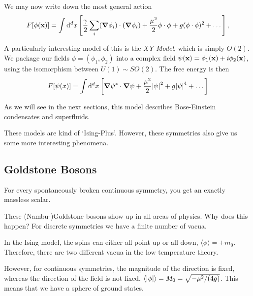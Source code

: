 We may now write down the most general action
\begin{equation}
  F[\phi(\vb{x})] = \int \dd[d]{x} \left[ \frac{\gamma}{2} \sum_i (\grad \phi_i) \cdot (\grad \phi_i) + \frac{\mu^2}{2} \phi \cdot \phi + g (\phi \cdot \phi)^2 + \dots \right],
\end{equation}

\begin{example}[O(2): XY-Model]
  A particularly interesting model of this is the \emph{XY-Model}, which is simply $O(2)$.
  We package our fields $\phi = (\phi_1, \phi_2)$ into a complex field $\psi(\vb{x}) = \phi_1 (\vb{x}) + i \phi_2 (\vb{x})$, using the isomorphism between $U(1) \sim SO(2)$.
  The free energy is then
  \begin{equation}
    F[\psi(x)] = \int \dd[d]{x} \left[ \grad \psi^* \cdot \grad \psi + \frac{\mu^2}{2} \abs{\psi}^2 + g \abs{ \psi}^4 + \dots \right]
  \end{equation}

  As we will see in the next sections, this model describes Bose-Einstein condensates and superfluids.
\end{example}

\begin{example}
\end{example}

These models are kind of `Ising-Plus'. However, these symmetries also give us some more interesting phenomena.


\subsection{Goldstone Bosons}%
\label{sub:goldstone_bosons}

\begin{theorem}[]
  For every spontaneously broken continuous symmetry, you get an exactly massless scalar.
\end{theorem}
These (Nambu-)Goldstone bosons show up in all areas of physics.
Why does this happen? 
For discrete symmetries we have a finite number of vacua.
\begin{example}[$\mathbb{Z}_2$]
  In the Ising model, the spins can either all point up or all down, $\langle \phi \rangle = \pm m_0$.
  Therefore, there are two different vacua in the low temperature theory.
\end{example}
However, for continuous symmetries, the magnitude of the direction is fixed, whereas the direction of the field is not fixed.
$\langle \abs{\phi} \rangle = M_0  = \sqrt{-\mu^2 / (4g)}$.
This means that we have a sphere of ground states.

